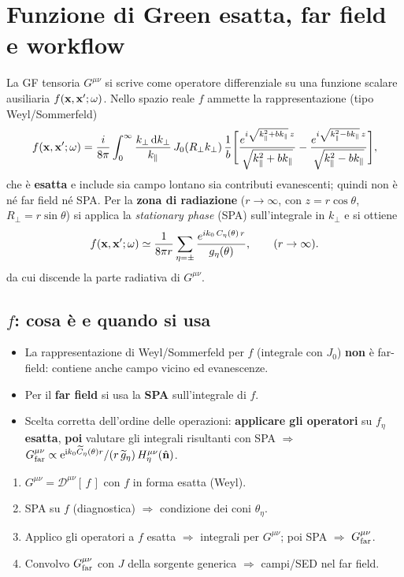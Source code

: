 \documentclass[11pt,a4paper]{article}
\newcommand{\wt}[1]{\widetilde{#1}}
\newcommand{\ii}{\mathrm{i}}
\newcommand{\ee}{\mathrm{e}}
\newcommand{\w}{\omega}
\newcommand{\bn}{\hat{\mathbf n}}
\newcommand{\Ct}{\wt{C}}
\newcommand{\gt}{\wt{g}}
\newcommand{\Ceta}{C_{\eta}}
\newcommand{\kpar}{k_{\parallel}}
\newcommand{\kperp}{k_{\perp}}
\newcommand{\Rperp}{R_{\perp}}
\newcommand{\dd}{\mathrm{d}}
\begin{document}
\section{Funzione di Green esatta, far field e workflow}
La GF tensoria $G^{\mu\nu}$ si scrive come operatore differenziale su una funzione scalare ausiliaria $f(\vb{x},\vb{x}';\w)$. Nello spazio reale $f$ ammette la rappresentazione (tipo Weyl/Sommerfeld)
\begin{equation}
f(\vb{x},\vb{x}';\w)=\frac{i}{8\pi}\int_{0}^{\infty}\frac{\kperp \,\dd\kperp}{\kpar}\,J_{0}(\Rperp \kperp)\,\frac{1}{b}
\Biggl[\frac{e^{i\sqrt{\kpar^{2}+b\kpar}\,z}}{\sqrt{\kpar^{2}+b\kpar}}-\frac{e^{i\sqrt{\kpar^{2}-b\kpar}\,z}}{\sqrt{\kpar^{2}-b\kpar}}\Biggr],
\end{equation}
che è \textbf{esatta} e include sia campo lontano sia contributi evanescenti; quindi non è né far field né SPA.
\medskip
Per la \textbf{zona di radiazione} ($r\to\infty$, con $z=r\cos\theta$, $\Rperp=r\sin\theta$) si applica la \emph{stationary phase} (SPA) sull'integrale in $\kperp$ e si ottiene
\begin{equation}
f(\vb{x},\vb{x}';\w)\simeq\frac{1}{8\pi r}\sum_{\eta=\pm}\frac{e^{i k_{0}\, \Ceta(\theta)\,r}}{g_{\eta}(\theta)},
\qquad (r\to\infty).
\end{equation}
da cui discende la parte radiativa di $G^{\mu\nu}$.

\subsection*{\texorpdfstring{$f$}{f}: cosa \`e e quando si usa}
\begin{itemize}
  \item La rappresentazione di Weyl/Sommerfeld per $f$ (integrale con $J_0$) \textbf{non} \`e far-field: contiene anche campo vicino ed evanescenze.
  \item Per il \textbf{far field} si usa la \textbf{SPA} sull'integrale di $f$.
  \item Scelta corretta dell'ordine delle operazioni: \textbf{applicare gli operatori} su $f_\eta$ \textbf{esatta}, \textbf{poi} valutare gli integrali risultanti con SPA $\Rightarrow$ $G^{\mu\nu}_{\rm far}\propto \ee^{\ii k_0 \Ct_\eta(\theta) r}/(r\,\gt_\eta)\,H^{\mu\nu}_\eta(\bn)$.
\end{itemize}

\begin{enumerate}
  \item $G^{\mu\nu}=\mathcal{D}^{\mu\nu}[\,f\,]$ con $f$ in forma esatta (Weyl).
  \item SPA su $f$ (diagnostica) $\Rightarrow$ condizione dei coni $\theta_\eta$.
  \item Applico gli operatori a $f$ esatta $\Rightarrow$ integrali per $G^{\mu\nu}$; poi SPA $\Rightarrow$ $G^{\mu\nu}_{\rm far}$.
  \item Convolvo $G^{\mu\nu}_{\rm far}$ con $J$ della sorgente generica $\Rightarrow$ campi/SED nel far field.
\end{enumerate}
\end{document}
